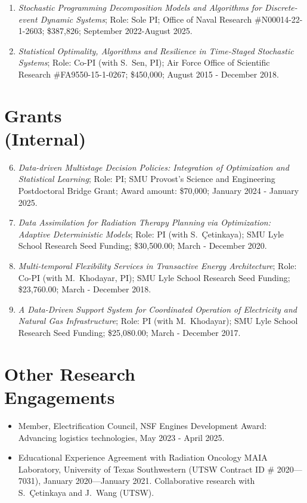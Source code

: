 \documentclass[hyperref, margin]{myResume}
\begin{document}
\begin{resume}
\begin{enumerate}[label=G\arabic*., leftmargin=*]
	\item \emph{Stochastic Programming Decomposition Models and Algorithms for Discrete-event Dynamic Systems}; Role: Sole PI; Office of Naval Research \#N00014-22-1-2603; \$387,826; September 2022-August 2025.

	\item \emph{Statistical Optimality, Algorithms and Resilience in Time-Staged Stochastic Systems}; Role: Co-PI (with S.\ Sen, PI); Air Force Office of Scientific Research \#FA9550-15-1-0267; \$450,000; August 2015 - December 2018.
\end{enumerate}

\section{Grants\\(Internal)}
\begin{enumerate}[label=G\arabic*., leftmargin=*] \setcounter{enumi}{5}

	\item \emph{Data-driven Multistage Decision Policies: Integration of Optimization and Statistical Learning}; Role: PI; SMU Provost's Science and Engineering Postdoctoral Bridge Grant; Award amount: \$70,000; January 2024 - January 2025.

	\item \emph{Data Assimilation for Radiation Therapy Planning via Optimization: Adaptive Deterministic Models}; Role: PI (with S.\ \c{C}etinkaya); SMU Lyle School Research Seed Funding; \$30,500.00; March - December 2020.

	\item \emph{Multi-temporal Flexibility Services in Transactive Energy Architecture}; Role: Co-PI (with M.\ Khodayar, PI); SMU Lyle School Research Seed Funding; \$23,760.00; March - December 2018.

	\item \emph{A Data-Driven Support System for Coordinated Operation of Electricity and Natural Gas Infrastructure}; Role: PI (with M.\ Khodayar); SMU Lyle School Research Seed Funding; \$25,080.00; March - December 2017.
\end{enumerate}

\section{Other Research\\Engagements}
\begin{itemize}[leftmargin=17pt]
	\item Member, Electrification Council, NSF Engines Development Award: Advancing logistics technologies, May 2023 - April 2025.
	\item Educational Experience Agreement with Radiation Oncology MAIA Laboratory, University of Texas Southwestern (UTSW Contract ID \# 2020—7031), January 2020—January 2021. Collaborative research with S.\ \c{C}etinkaya and J.\ Wang (UTSW).
\end{itemize}


\end{resume}
\end{document}
